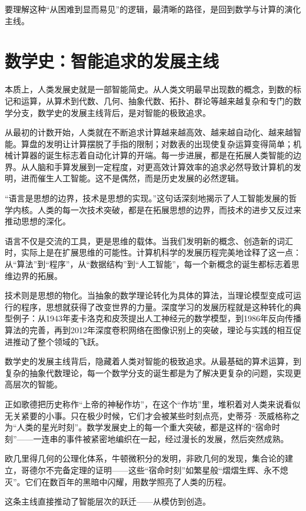 要理解这种“从困难到显而易见”的逻辑，最清晰的路径，是回到数学与计算的演化主线。

\section{数学史：智能追求的发展主线}

本质上，人类发展史就是一部智能简史。从人类文明最早出现数的概念，到数的标记和运算，从算术到代数、几何、抽象代数、拓扑、群论等越来越复杂和专门的数学分支，数学史的发展主线背后，是对智能的极致追求。

从最初的计数开始，人类就在不断追求计算越来越高效、越来越自动化、越来越智能。算盘的发明让计算摆脱了手指的限制；对数表的出现使复杂运算变得简单；机械计算器的诞生标志着自动化计算的开端。每一步进展，都是在拓展人类智能的边界。从人脑和手算发展到一定程度，对更高效计算效率的追求必然导致计算机的发明，进而催生人工智能。这不是偶然，而是历史发展的必然逻辑。


“语言是思想的边界，技术是思想的实现。”这句话深刻地揭示了人工智能发展的哲学内核。人类的每一次技术突破，都是在拓展思想的边界，而技术的进步又反过来推动思想的深化。

语言不仅是交流的工具，更是思维的载体。当我们发明新的概念、创造新的词汇时，实际上是在扩展思维的可能性。计算机科学的发展历程完美地诠释了这一点：从“算法”到“程序”，从“数据结构”到“人工智能”，每一个新概念的诞生都标志着思维边界的拓展。

技术则是思想的物化。当抽象的数学理论转化为具体的算法，当理论模型变成可运行的程序，思想就获得了改变世界的力量。深度学习的发展历程就是这种转化的典型例子：从1943年麦卡洛克和皮茨提出人工神经元的数学模型，到1986年反向传播算法的完善，再到2012年深度卷积网络在图像识别上的突破，理论与实践的相互促进推动了整个领域的飞跃。

数学史的发展主线背后，隐藏着人类对智能的极致追求。从最基础的算术运算，到复杂的抽象代数理论，每一个数学分支的诞生都是为了解决更复杂的问题，实现更高层次的智能。

正如歌德把历史称作“上帝的神秘作坊”，在这个“作坊”里，堆积着对人类来说看似无关紧要的小事。只在极少时候，它们才会被某些时刻点亮，史蒂芬·茨威格称之为“人类的星光时刻”。数学发展史上的每一个重大突破，都是这样的“宿命时刻”——一连串的事件被紧密地编织在一起，经过漫长的发展，然后突然成熟。

欧几里得几何的公理化体系，牛顿微积分的发明，非欧几何的发现，集合论的建立，哥德尔不完备定理的证明——这些“宿命时刻”如繁星般“熠熠生辉、永不熄灭”。它们在数百年的黑暗中闪耀，用数学照亮了人类的历程。

这条主线直接推动了智能层次的跃迁——从模仿到创造。

